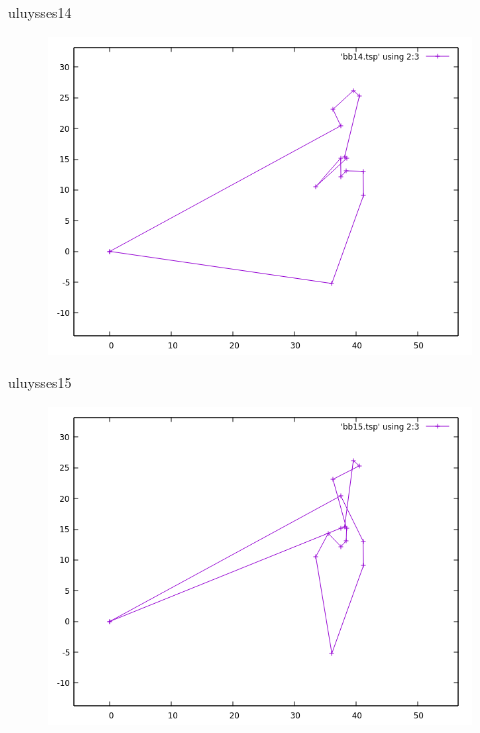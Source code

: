 \documentclass{beamer}
\begin{document}
\begin{frame}[fragile]{uluysses14}
\begin{figure}[H]
\centering
\includegraphics[scale=0.5]{bb14.png}
\end{figure}
\end{frame}

\begin{frame}[fragile]{uluysses15}
\begin{figure}[H]
\centering
\includegraphics[scale=0.5]{bb15.png}
\end{figure}
\end{frame}
\end{document}
